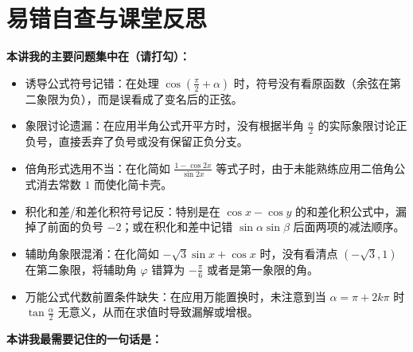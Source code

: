 \documentclass[11pt,a4paper]{ctexart}
\begin{document}
\newpage

\section{易错自查与课堂反思}

\vspace{0.5em}
\noindent\textbf{本讲我的主要问题集中在（请打勾）：}
\begin{itemize}[itemsep=0.4em]
  \item \checkbox 诱导公式符号记错：在处理 $\cos(\frac{\pi}{2}+\alpha)$ 时，符号没有看原函数（余弦在第二象限为负），而是误看成了变名后的正弦。
  \item \checkbox 象限讨论遗漏：在应用半角公式开平方时，没有根据半角 $\frac{\alpha}{2}$ 的实际象限讨论正负号，直接丢弃了负号或没有保留正负分支。
  \item \checkbox 倍角形式选用不当：在化简如 $\frac{1-\cos 2x}{\sin 2x}$ 等式子时，由于未能熟练应用二倍角公式消去常数 $1$ 而使化简卡壳。
  \item \checkbox 积化和差/和差化积符号记反：特别是在 $\cos x - \cos y$ 的和差化积公式中，漏掉了前面的负号 $-2$；或在积化和差中记错 $\sin\alpha\sin\beta$ 后面两项的减法顺序。
  \item \checkbox 辅助角象限混淆：在化简如 $-\sqrt{3}\sin x + \cos x$ 时，没有看清点 $(-\sqrt{3}, 1)$ 在第二象限，将辅助角 $\varphi$ 错算为 $-\frac{\pi}{6}$ 或者是第一象限的角。
  \item \checkbox 万能公式代数前置条件缺失：在应用万能置换时，未注意到当 $\alpha = \pi + 2k\pi$ 时 $\tan\frac{\alpha}{2}$ 无意义，从而在求值时导致漏解或增根。
\end{itemize}

\vspace{1em}
\noindent\textbf{本讲我最需要记住的一句话是：}
\vspace{0.5em}

\blank{14cm}
\end{document}
